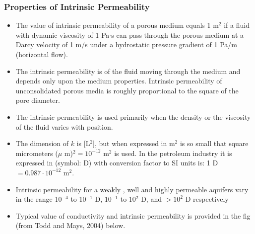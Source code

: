 \documentclass[letterpaper,10pt,english]{sphinxmanual}
\let\sphinxpxdimen\pdfpxdimen\else\newdimen\sphinxpxdimen
\begin{document}
\subsubsection{Properties of Intrinsic Permeability}
\label{\detokenize{contents/flow/lecture_04/14_darcy_law_K:properties-of-intrinsic-permeability}}\begin{itemize}
\item {} 
The value of intrinsic permeability of a porous medium
equals 1 m\(^2\) if a fluid with dynamic viscosity of 1 Pa\(\cdot\)s can pass through the porous
medium at a Darcy velocity of 1 m/s under a hydrostatic pressure gradient of 1 Pa/m
(horizontal flow).

\item {} 
The intrinsic permeability is  of the fluid moving through the medium and depends only upon the medium properties. Intrinsic
permeability of unconsolidated porous media is roughly proportional to the square of
the pore diameter.

\item {} 
The intrinsic permeability is used primarily when the density or the viscosity of the
fluid varies with position.

\item {} 
The dimension of \(k\) is {[}L\(^2\){]}, but when expressed in m\(^2\) is so small that square
micrometers (\(\mu\) m)\(^2  = 10^{-12}\) m\(^2\) is used. In the petroleum industry it is expressed in 
(symbol: D) with conversion factor to SI units is:  1 D \(= 0.987\cdot 10^{-12}\) m\(^2\).

\item {} 
Intrinsic permeability for a weakly , well and
highly permeable aquifers vary in the range 10\(^{-4}\) to 10\(^{-1}\) D, 10\(^{-1}\) to 10\(^2\) D, and \(> 10^2\) D
respectively

\item {} 
Typical value of conductivity and intrinsic permeability is  provided in the fig (from Todd and Mays, 2004) below.

\end{itemize}

\noindent\sphinxincludegraphics[width=700\sphinxpxdimen]{{L4_f7}.png}
\end{document}
